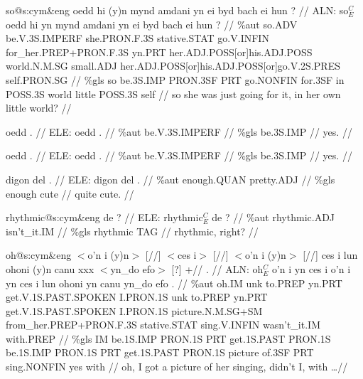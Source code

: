 \documentclass[a4paper,10pt]{article}
\begin{document}
\ex
\begingl[lingstyle=gergl]
\glchat so@s:cym\&eng oedd hi (y)n mynd amdani yn ei byd bach ei hun ? //
\glsurface ALN:  so$^{C}_{E}$ oedd hi yn mynd amdani yn ei byd bach ei hun ?  //
\glauto \%aut  so{\scriptsize .ADV} be{\scriptsize .V.3S.IMPERF} she{\scriptsize .PRON.F.3S} stative{\scriptsize .STAT} go{\scriptsize .V.INFIN} for\_her{\scriptsize .PREP+PRON.F.3S} yn{\scriptsize .PRT} her{\scriptsize .ADJ.POSS[or]his.ADJ.POSS} world{\scriptsize .N.M.SG} small{\scriptsize .ADJ} her{\scriptsize .ADJ.POSS[or]his.ADJ.POSS[or]go.V.2S.PRES} self{\scriptsize .PRON.SG}   //
\glmanual \%gls  so be{\scriptsize .3S.IMP} PRON{\scriptsize .3SF} PRT go{\scriptsize .NONFIN} for{\scriptsize .3SF} in POSS{\scriptsize .3S} world little POSS{\scriptsize .3S} self   //
\gleng so she was just going for it, in her own little world? //
\endgl
\xe

\ex
\begingl[lingstyle=gergl]
\glchat oedd . //
\glsurface ELE:  oedd .  //
\glauto \%aut  be{\scriptsize .V.3S.IMPERF}   //
\glmanual \%gls  be{\scriptsize .3S.IMP}   //
\gleng yes. //
\endgl
\xe

\ex
\begingl[lingstyle=gergl]
\glchat oedd . //
\glsurface ELE:  oedd .  //
\glauto \%aut  be{\scriptsize .V.3S.IMPERF}   //
\glmanual \%gls  be{\scriptsize .3S.IMP}   //
\gleng yes. //
\endgl
\xe

\ex
\begingl[lingstyle=gergl]
\glchat digon del . //
\glsurface ELE:  digon del .  //
\glauto \%aut  enough{\scriptsize .QUAN} pretty{\scriptsize .ADJ}   //
\glmanual \%gls  enough cute   //
\gleng quite cute. //
\endgl
\xe

\ex
\begingl[lingstyle=gergl]
\glchat rhythmic@s:cym\&eng de ? //
\glsurface ELE:  rhythmic$^{C}_{E}$ de ?  //
\glauto \%aut  rhythmic{\scriptsize .ADJ} isn't\_it{\scriptsize .IM}   //
\glmanual \%gls  rhythmic TAG   //
\gleng rhythmic, right? //
\endgl
\xe

\ex
\begingl[lingstyle=gergl]
\glchat oh@s:cym\&eng $<$o'n i (y)n$>$ [//] $<$ces i$>$ [//] $<$o'n i (y)n$>$ [//] ces i lun ohoni (y)n canu xxx $<$yn\_do efo$>$ [?] +// . //
\glsurface ALN:  oh$^{C}_{E}$ o'n i yn ces i o'n i yn ces i lun ohoni yn canu yn\_do efo .  //
\glauto \%aut  oh{\scriptsize .IM} unk to{\scriptsize .PREP} yn{\scriptsize .PRT} get{\scriptsize .V.1S.PAST.SPOKEN} I{\scriptsize .PRON.1S} unk to{\scriptsize .PREP} yn{\scriptsize .PRT} get{\scriptsize .V.1S.PAST.SPOKEN} I{\scriptsize .PRON.1S} picture{\scriptsize .N.M.SG+SM} from\_her{\scriptsize .PREP+PRON.F.3S} stative{\scriptsize .STAT} sing{\scriptsize .V.INFIN} wasn't\_it{\scriptsize .IM} with{\scriptsize .PREP}   //
\glmanual \%gls  IM be{\scriptsize .1S.IMP} PRON{\scriptsize .1S} PRT get{\scriptsize .1S.PAST} PRON{\scriptsize .1S} be{\scriptsize .1S.IMP} PRON{\scriptsize .1S} PRT get{\scriptsize .1S.PAST} PRON{\scriptsize .1S} picture of{\scriptsize .3SF} PRT sing{\scriptsize .NONFIN} yes with   //
\gleng oh, I got a picture of her singing, didn't I, with \dots  //
\endgl
\xe
\end{document}
